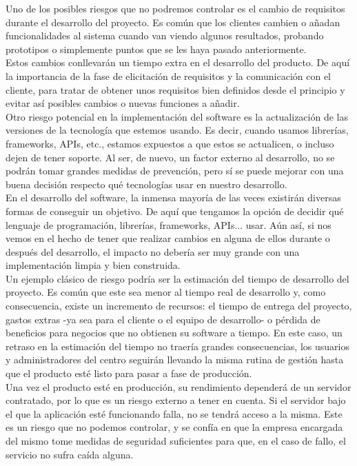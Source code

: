 Uno de los posibles riesgos que no podremos controlar es el cambio de requisitos durante el desarrollo del proyecto. Es común que los clientes cambien o añadan funcionalidades al sistema cuando van viendo algunos resultados, probando prototipos o simplemente puntos que se les haya pasado anteriormente. \\
Estos cambios conllevarán un tiempo extra en el desarrollo del producto. De aquí la importancia de la fase de elicitación de requisitos y la comunicación con el cliente, para tratar de obtener unos requisitos bien definidos desde el principio y evitar así posibles cambios o nuevas funciones a añadir.
\\

Otro riesgo potencial en la implementación del software es la actualización de las versiones de la tecnología que estemos usando. Es decir, cuando usamos librerías, frameworks, APIs, etc., estamos expuestos a que estos se actualicen, o incluso dejen de tener soporte. Al ser, de nuevo, un factor externo al desarrollo, no se podrán tomar grandes medidas de prevención, pero sí se puede mejorar con una buena decisión respecto qué tecnologías usar en nuestro desarrollo. \\
En el desarrollo del software, la inmensa mayoría de las veces existirán diversas formas de conseguir un objetivo. De aquí que tengamos la opción de decidir qué lenguaje de programación, librerías, frameworks, APIs... usar. Aún así, si nos vemos en el hecho de tener que realizar cambios en alguna de ellos durante o después del desarrollo, el impacto no debería ser muy grande con una implementación limpia y bien construida. 
\\

Un ejemplo clásico de riesgo podría ser la estimación del tiempo de desarrollo del proyecto. Es común que este sea menor al tiempo real de desarrollo y, como consecuencia, existe un incremento de recursos: el tiempo de entrega del proyecto, gastos extras -ya sea para el cliente o el equipo de desarrollo- o pérdida de beneficios para negocios que no obtienen su software a tiempo. En este caso, un retraso en la estimación del tiempo no traería grandes consecuencias, los usuarios y administradores del centro seguirán llevando la misma rutina de gestión hasta que el producto esté listo para pasar a fase de producción.
\\

Una vez el producto esté en producción, su rendimiento dependerá de un servidor contratado, por lo que es un riesgo externo a tener en cuenta. Si el servidor bajo el que la aplicación esté funcionando falla, no se tendrá acceso a la misma. Este es un riesgo que no podemos controlar, y se confía en que la empresa encargada del mismo tome medidas de seguridad suficientes para que, en el caso de fallo, el servicio no sufra caída alguna. 


